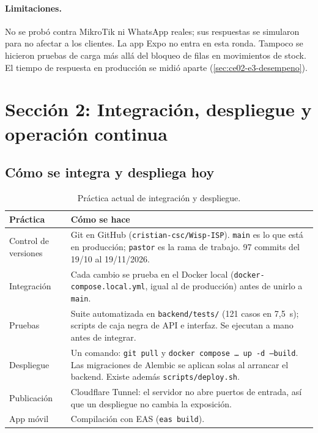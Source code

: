 \paragraph{Limitaciones.} No se probó contra MikroTik ni WhatsApp reales; sus respuestas se
simularon para no afectar a los clientes. La app Expo no entra en esta ronda. Tampoco se
hicieron pruebas de carga más allá del bloqueo de filas en movimientos de stock. El tiempo de
respuesta en producción se midió aparte (\cref{sec:ce02-e3-desempeno}).

\section{Sección 2: Integración, despliegue y operación continua}
\label{sec:ce02-e4-cicd}

\subsection{Cómo se integra y despliega hoy}

\begin{table}[H]
\centering
\caption{Práctica actual de integración y despliegue.}
\label{tab:ce02-e4-actual}
\small
\begin{tabularx}{\textwidth}{L{3.2cm}X}
\toprule
\textbf{Práctica} & \textbf{Cómo se hace} \\
\midrule
Control de versiones & Git en GitHub (\texttt{cristian-csc/Wisp-ISP}). \texttt{main} es lo que está en producción; \texttt{pastor} es la rama de trabajo. 97 commits del 19/10 al 19/11/2026. \\
Integración & Cada cambio se prueba en el Docker local (\texttt{docker-compose.local.yml}, igual al de producción) antes de unirlo a \texttt{main}. \\
Pruebas & Suite automatizada en \texttt{backend/tests/} (121 casos en 7,5~s); scripts de caja negra de API e interfaz. Se ejecutan a mano antes de integrar. \\
Despliegue & Un comando: \texttt{git pull} y \texttt{docker compose \ldots{} up -d --build}. Las migraciones de Alembic se aplican solas al arrancar el backend. Existe además \texttt{scripts/deploy.sh}. \\
Publicación & Cloudflare Tunnel: el servidor no abre puertos de entrada, así que un despliegue no cambia la exposición. \\
App móvil & Compilación con EAS (\texttt{eas build}). \\
\bottomrule
\end{tabularx}
\end{table}

